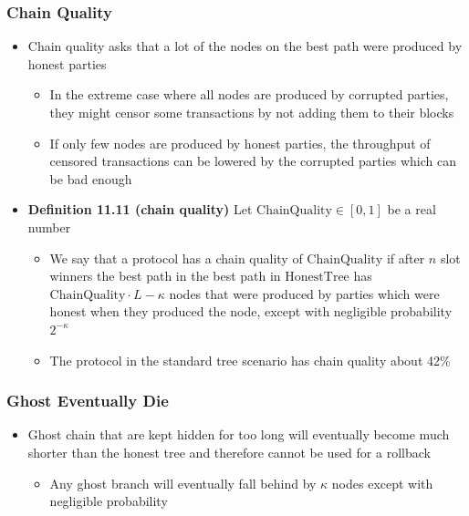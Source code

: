 \documentclass[11pt]{article}
\begin{document}
\subsubsection{Chain Quality}
\label{sec:orgb9b9189}
\begin{itemize}
\item Chain quality asks that a lot of the nodes on the best path were produced by honest parties
\begin{itemize}
\item In the extreme case where all nodes are produced by corrupted parties, they might censor some transactions by not adding them to their blocks
\item If only few nodes are produced by honest parties, the throughput of censored transactions can be lowered by the corrupted parties which can be bad enough
\end{itemize}

\item \textbf{Definition 11.11 (chain quality)} Let \(\text{ChainQuality} \in [0,1]\) be a real number
\begin{itemize}
\item We say that a protocol has a chain quality of \(\text{ChainQuality}\) if after \(n\) slot winners the best path in the best path in \(\text{HonestTree}\) has \(\text{ChainQuality} \cdot L - \kappa\) nodes that were produced by parties which were honest when they produced the node, except with negligible probability \(2^{-\kappa}\)
\item The protocol in the standard tree scenario has chain quality about 42\%
\end{itemize}
\end{itemize}

\subsubsection{Ghost Eventually Die}
\label{sec:org900298b}
\begin{itemize}
\item Ghost chain that are kept hidden for too long will eventually become much shorter than the honest tree and therefore cannot be used for a rollback
\begin{itemize}
\item Any ghost branch will eventually fall behind by \(\kappa\) nodes except with negligible probability
\end{itemize}
\end{itemize}
\end{document}
